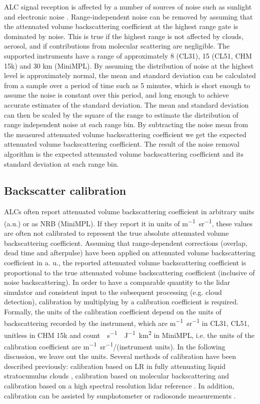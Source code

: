ALC signal reception is affected by a number of sources of noise such
as sunlight and electronic noise \citep{kotthaus2016}. Range-independent
noise can be removed by assuming that the attenuated
volume backscattering coefficient at the highest range gate is dominated by
noise. This is true if the highest range is not affected
by clouds, aerosol, and if contributions from molecular scattering are negligible.
The supported instruments have a range of approximately 8 (CL31), 15
(CL51, CHM 15k) and 30 km (MiniMPL).
By assuming the distribution of noise at the highest level is approximately
normal, the mean and standard deviation can be calculated from a sample over a
period of time such as 5 minutes, which is short enough to assume the noise is constant
over this period, and long enough to achieve accurate estimates of the standard
deviation. The mean and standard deviation can then be scaled by the
square of the range to estimate the distribution of range independent noise at
each range bin. By subtracting the noise mean from the measured attenuated volume backscattering coefficient
we get the expected attenuated volume backscattering coefficient. The result of the noise removal algorithm
is the expected attenuated volume backscattering coefficient and its standard deviation at each range bin.

\subsection{Backscatter calibration}
\label{sec:3:backscatter-calibration}

ALCs often report attenuated volume backscattering coefficient in arbitrary units (a.u.) or as NRB (MiniMPL).
If they report it in units of \unit{m^{-1}sr^{-1}}, these values are often not calibrated to
represent the true absolute attenuated volume backscattering coefficient.
Assuming that range-dependent corrections (overlap, dead time and afterpulse)
have been applied on attenuated volume backscattering coefficient in a. u., the reported attenuated volume backscattering coefficient is proportional
to the true attenuated volume backscattering coefficient (inclusive of noise backscattering).
In order to have a comparable quantity to the lidar simulator and consistent
input to the subsequent processing (e.g. cloud detection), calibration by
multiplying by a calibration coefficient is required.
Formally, the units of the calibration coefficient depend on the units
of backscattering recorded by the instrument, which are \unit{m^{-1}sr^{-1}}
in CL31, CL51, unitless in CHM 15k and \unit{count.\mu s^{-1}\mu J^{-1}km^2}
in MiniMPL, i.e. the units of the calibration coefficient are \unit{m^{-1}sr^{-1}}/(instrument units).
In the following discussion, we leave out the units.
Several methods of calibration have been described previously:
calibration based on LR in fully attenuating liquid stratocumulus
clouds \citep{oconnor2004,hopkin2019}, calibration based on molecular
backscattering \citep{wiegner2014} and calibration based on a high spectral resolution lidar
reference \citep{heese2010,jin2015}. In addition, calibration can be
assisted by sunphotometer or radiosonde measurements \citep{wiegner2014}.

